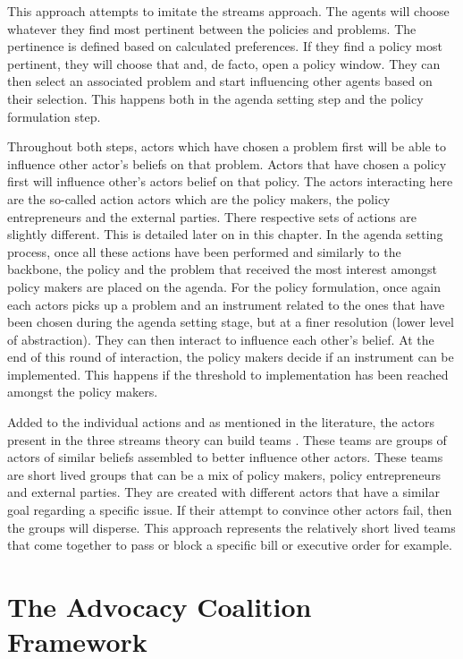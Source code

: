 This approach attempts to imitate the streams approach. The agents will choose whatever they find most pertinent between the policies and problems. The pertinence is defined based on calculated preferences. If they find a policy most pertinent, they will choose that and, de facto, open a policy window. They can then select an associated problem and start influencing other agents based on their selection. This happens both in the agenda setting step and the policy formulation step.
 
Throughout both steps, actors which have chosen a problem first will be able to influence other actor's beliefs on that problem. Actors that have chosen a policy first will influence other's actors belief on that policy. The actors interacting here are the so-called action actors which are the policy makers, the policy entrepreneurs and the external parties. There respective sets of actions are slightly different. This is detailed later on in this chapter. In the agenda setting process, once all these actions have been performed and similarly to the backbone, the policy and the problem that received the most interest amongst policy makers are placed on the agenda. For the policy formulation, once again each actors picks up a problem and an instrument related to the ones that have been chosen during the agenda setting stage, but at a finer resolution (lower level of abstraction). They can then interact to influence each other's belief. At the end of this round of interaction, the policy makers decide if an instrument can be implemented. This happens if the threshold to implementation has been reached amongst the policy makers.
 
Added to the individual actions and as mentioned in the literature, the actors present in the three streams theory can build teams \citep{mintrom2009policy, brouwer2011towards}. These teams are groups of actors of similar beliefs assembled to better influence other actors. These teams are short lived groups that can be a mix of policy makers, policy entrepreneurs and external parties. They are created with different actors that have a similar goal regarding a specific issue. If their attempt to convince other actors fail, then the groups will disperse. This approach represents the relatively short lived teams that come together to pass or block a specific bill or executive order for example. 


%
\section{The Advocacy Coalition Framework}
\label{sec:ACF}

